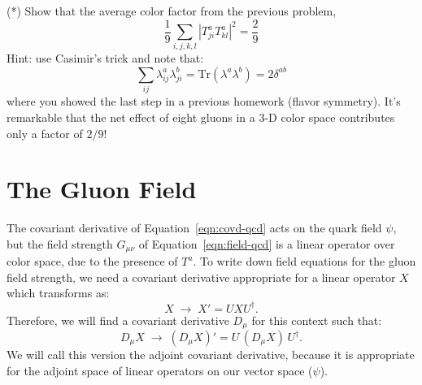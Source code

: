 \documentclass[12pt]{article}
\newcommand{\Tr}{\mathrm{Tr}}
\begin{document}
\exercise (*) Show that the average color factor from the previous problem,
$$\frac{1}{9} \sum_{i,j,k,l} | T_{ji}^a T_{kl}^a |^2= \frac{2}{9}$$
Hint:  use Casimir's trick and note that:
$$\sum_{ij} \lambda_{ij}^a \lambda_{ji}^b = \Tr(\lambda^a \lambda^b) = 2 \delta^{ab}$$
where you showed the last step in a previous homework (flavor symmetry).  It's remarkable that the net effect of eight gluons in a 3-D color space contributes only a factor of $2/9$!

\section{The Gluon Field}

The covariant derivative of Equation~\ref{eqn:covd-qcd} acts on the
quark field $\psi$, but the field strength $G_{\mu\nu}$ of
Equation~\ref{eqn:field-qcd} is a linear operator over color space,
due to the presence of $T^a$.  To write down field equations for the
gluon field strength, we need a covariant derivative appropriate for a
linear operator $X$ which transforms as:
\begin{equation*}
    X \;\longrightarrow\; X' = U X U^\dagger.
\end{equation*}
Therefore, we will find a covariant derivative $D_\mu$ for this
context such that:
\begin{equation*}
    D_\mu X \;\longrightarrow\; (D_\mu X)' = U\, (D_\mu X)\, U^\dagger.
\end{equation*}
We will call this version the adjoint covariant derivative, because it
is appropriate for the adjoint space of linear operators on our vector
space ($\psi$).
\end{document}
